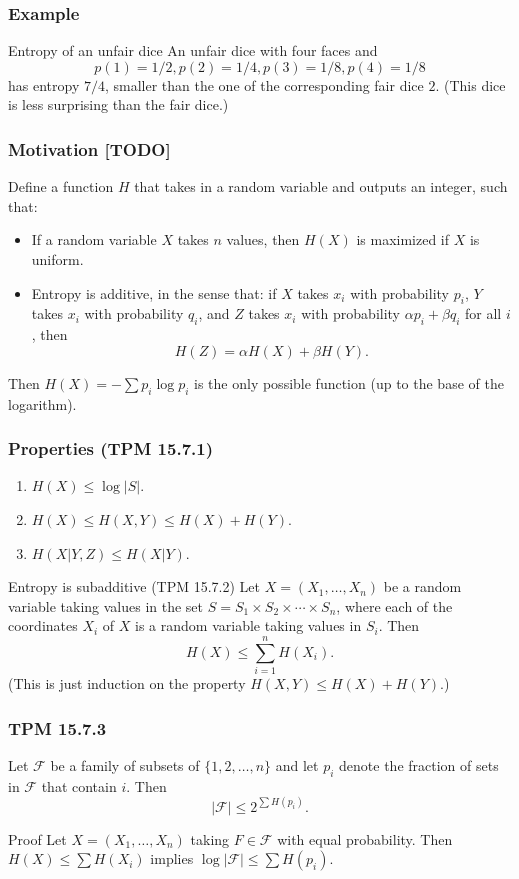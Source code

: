 \documentclass{beamer}
\begin{document}
\begin{frame}
  \frametitle{Example}
  \begin{exampleblock}{Entropy of an unfair dice}
    An unfair dice with four faces and \[ p(1) = 1/2, p(2) = 1/4, p(3) = 1/8, p(4) = 1/8 \] has entropy $7/4$, smaller than the one of the corresponding fair dice $2$. (This dice is less surprising than the fair dice.)
  \end{exampleblock}
\end{frame}

\begin{frame}
  \frametitle{Motivation [TODO]}
  Define a function $H$ that takes in a random variable and outputs an integer, such that:
  \begin{itemize}
    \item If a random variable $X$ takes $n$ values, then $H(X)$ is maximized if $X$ is uniform.
    \item Entropy is additive, in the sense that: if $X$ takes $x_i$ with probability $p_i$, $Y$ takes $x_i$ with probability $q_i$, and $Z$ takes $x_i$ with probability $\alpha p_i + \beta q_i$ for all $i$, then \[ H(Z) = \alpha H(X) + \beta H(Y). \]
  \end{itemize}
  Then $H(X) = - \sum p_i \log p_i$ is the only possible function (up to the base of the logarithm).
\end{frame}

\begin{frame}
  \frametitle{Properties (TPM 15.7.1)}
  \begin{enumerate}
    \item $H(X) \le \log |S|$.
    \item $H(X) \le H(X, Y) \le H(X) + H(Y)$.
    \item $H(X|Y, Z) \le H(X|Y)$.
  \end{enumerate}

  \begin{block}{Entropy is subadditive (TPM 15.7.2)}
    Let $X = (X_1, \dotsc, X_n)$ be a random variable taking values in the set $S = S_1 \times S_2 \times \dotsb \times S_n$, where each of the coordinates $X_i$ of $X$ is a random variable taking values in $S_i$. Then \[ H(X) \le \sum_{i = 1}^n H(X_i). \] (This is just induction on the property $H(X, Y) \le H(X) + H(Y)$.)
  \end{block}
\end{frame}

\begin{frame}
  \frametitle{TPM 15.7.3}
  Let $\mathcal{F}$ be a family of subsets of $\{ 1, 2, \dotsc, n \}$ and let $p_i$ denote the fraction of sets in $\mathcal{F}$ that contain $i$. Then \[ |\mathcal{F}| \le 2^{\sum H(p_i)}. \]

  \begin{block}{Proof}
    Let $X = (X_1, \dotsc, X_n)$ taking $F \in \mathcal{F}$ with equal probability. Then $H(X) \le \sum H(X_i)$ implies $\log |\mathcal{F}| \le \sum H(p_i)$.
  \end{block}
\end{frame}
\end{document}

